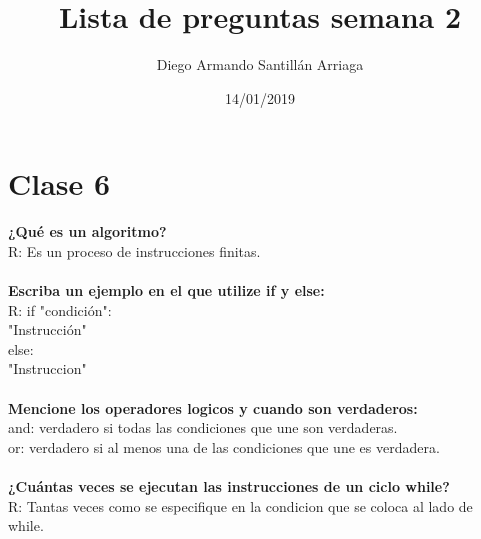 \documentclass[letter paper, 12pt, oneside]{article}
\title{\Huge Lista de preguntas semana 2}
\author{Diego Armando Santillán Arriaga}
\date{14/01/2019}
\begin{document}
	\maketitle
	\newpage
	\section{Clase 6}
	\textbf{¿Qué es un algoritmo?}
	\\
	R: Es un proceso de instrucciones finitas.
	\\\\
	\textbf{Escriba un ejemplo en el que utilize if y else:}
	\\
	R: if "condición":
	\\
	"Instrucción"
	\\
	else:
	\\"Instruccion"
\\\\	
	\textbf{Mencione los operadores logicos y cuando son verdaderos:}
\\
and: verdadero si todas las condiciones que une son verdaderas.
\\
or: verdadero si al menos una de las condiciones que une es verdadera. 
\\\\
\textbf{¿Cuántas veces se ejecutan las instrucciones de un ciclo while?}
\\
R: Tantas veces como se especifique en la condicion que se coloca al lado de while. 
\end{document}
